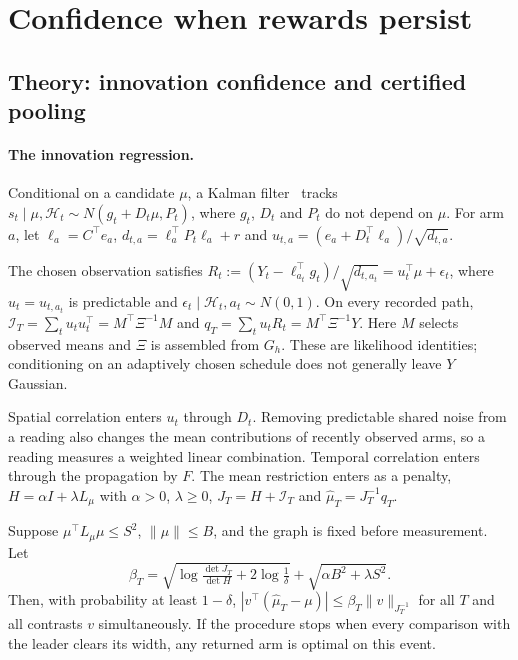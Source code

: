 \documentclass[sigconf,review,anonymous]{acmart}
\newcommand{\I}{\mathcal{I}}
\begin{document}
\section{Confidence when rewards persist}\label{sec:info}

\subsection{Theory: innovation confidence and certified pooling}

\paragraph{The innovation regression.} Conditional on a candidate $\mu$, a Kalman filter~\cite{kalman1960} tracks $s_t\mid\mu,\mathcal H_t\sim N(g_t+D_t\mu,P_t)$, where $g_t$, $D_t$ and $P_t$ do not depend on $\mu$. For arm $a$, let $\ell_a=C^\top e_a$, $d_{t,a}=\ell_a^\top P_t\ell_a+r$ and $u_{t,a}=(e_a+D_t^\top\ell_a)/\sqrt{d_{t,a}}$.

\begin{theorem}\label{thm:innov}
The chosen observation satisfies $R_t:=(Y_t-\ell_{a_t}^\top g_t)/\sqrt{d_{t,a_t}}=u_t^\top\mu+\epsilon_t$, where $u_t=u_{t,a_t}$ is predictable and $\epsilon_t\mid\mathcal H_t,a_t\sim N(0,1)$. On every recorded path, $\I_T=\sum_tu_tu_t^\top=M^\top\Xi^{-1}M$ and $q_T=\sum_tu_tR_t=M^\top\Xi^{-1}Y$. Here $M$ selects observed means and $\Xi$ is assembled from $G_h$. These are likelihood identities; conditioning on an adaptively chosen schedule does not generally leave $Y$ Gaussian.
\end{theorem}

Spatial correlation enters $u_t$ through $D_t$. Removing predictable shared noise from a reading also changes the mean contributions of recently observed arms, so a reading measures a weighted linear combination. Temporal correlation enters through the propagation by $F$. The mean restriction enters as a penalty, $H=\alpha I+\lambda L_\mu$ with $\alpha>0$, $\lambda\ge0$, $J_T=H+\I_T$ and $\hat\mu_T=J_T^{-1}q_T$.

\begin{theorem}\label{thm:conf}
Suppose $\mu^\top L_\mu\mu\le S^2$, $\|\mu\|\le B$, and the graph is fixed before measurement. Let
\[
\beta_T=\sqrt{\log\tfrac{\det J_T}{\det H}+2\log\tfrac1\delta}+\sqrt{\alpha B^2+\lambda S^2}.
\]
Then, with probability at least $1-\delta$, $|v^\top(\hat\mu_T-\mu)|\le\beta_T\|v\|_{J_T^{-1}}$ for all $T$ and all contrasts $v$ simultaneously. If the procedure stops when every comparison with the leader clears its width, any returned arm is optimal on this event.
\end{theorem}
\end{document}
